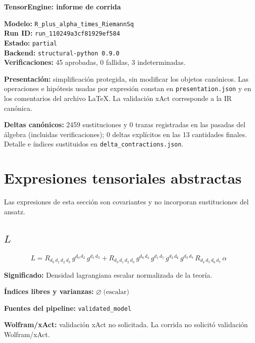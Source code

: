 \documentclass[11pt]{article}
\begin{document}
\begin{center}
{\Large\bfseries TensorEngine: informe de corrida}
\end{center}
\textbf{Modelo:} \texttt{R\_plus\_alpha\_times\_RiemannSq}\\
\textbf{Run ID:} \texttt{run\_110249a3cf81929ef584}\\
\textbf{Estado:} \texttt{partial}\\
\textbf{Backend:} \texttt{structural-python 0.9.0}\\
\textbf{Verificaciones:} 45 aprobadas, 0 fallidas, 3 indeterminadas.
\par\smallskip
\textbf{Presentación:} simplificación protegida, sin modificar los objetos canónicos. Las operaciones e hipótesis usadas por expresión constan en \texttt{presentation.json} y en los comentarios del archivo LaTeX. La validación xAct corresponde a la IR canónica.\par
\textbf{Deltas canónicos:} 2459 sustituciones y 0 trazas registradas en las pasadas del álgebra (incluidas verificaciones); 0 deltas explícitos en las 13 cantidades finales. Detalle e índices sustituidos en \texttt{delta\_contractions.json}.\par
\section*{Expresiones tensoriales abstractas}
Las expresiones de esta sección son covariantes y no incorporan sustituciones del ansatz.
\subsection*{$ L $}
\begin{dmath*}[breakdepth={5}]
L = R{}_{d_{0}\,d_{1}\,d_{2}\,d_{3}}\,g{}^{d_{0}\,d_{2}}\,g{}^{d_{1}\,d_{3}} + R{}_{d_{0}\,d_{1}\,d_{2}\,d_{3}}\,g{}^{d_{0}\,d_{4}}\,g{}^{d_{1}\,d_{5}}\,g{}^{d_{2}\,d_{6}}\,g{}^{d_{3}\,d_{7}}\,R{}_{d_{4}\,d_{5}\,d_{6}\,d_{7}}\,\alpha
\end{dmath*}
\par\vspace{1.2\baselineskip}\noindent
\begin{minipage}{\linewidth}
\textbf{Significado:} Densidad lagrangiana escalar normalizada de la teoría.\par
\textbf{Índices libres y varianzas:} $ \varnothing\;\text{(escalar)} $\par
\textbf{Fuentes del pipeline:} \texttt{validated\_model}\par
\textbf{Wolfram/xAct:} validación xAct no solicitada. La corrida no solicitó validación Wolfram/xAct.\par
\end{minipage}
\end{document}
